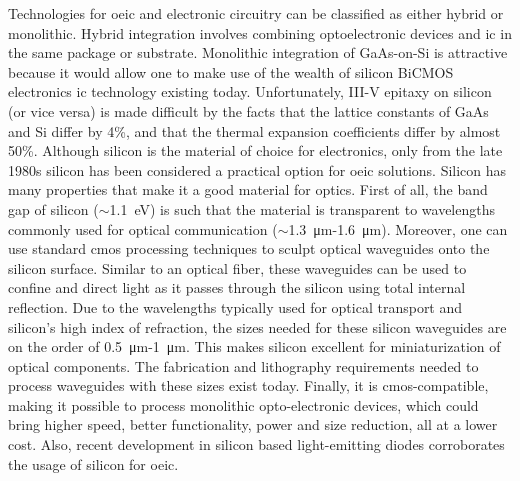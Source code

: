\documentclass[../report.tex]{subfiles}
\begin{document}
Technologies for \gls{oeic} and electronic circuitry can be classified as either hybrid or monolithic. Hybrid integration involves combining optoelectronic devices and \gls{ic} in the same package or substrate. Monolithic integration of GaAs-on-Si is attractive because it would allow one to make use of the wealth of silicon BiCMOS electronics \gls{ic} technology existing today. Unfortunately, III-V epitaxy on silicon (or vice versa) is made difficult by the facts that the lattice constants of GaAs and Si differ by 4\%, and that the thermal expansion coefficients differ by almost 50\%. Although silicon is the material of choice for electronics, only from the late 1980s silicon has been considered a practical option for \gls{oeic} solutions. Silicon has many properties that make it a good material for optics. First of all, the band gap of silicon ($\sim$\SI{1.1}{\electronvolt}) is such that the material is transparent to wavelengths commonly used for optical communication ($\sim$\SI{1.3}{\micro\metre}-\SI{1.6}{\micro\metre}). Moreover, one can use standard \gls{cmos} processing techniques to sculpt optical waveguides onto the silicon surface. Similar to an optical fiber, these waveguides can be used to confine and direct light as it passes through the silicon \cite{reed_silicon_2004} using total internal reflection. Due to the wavelengths typically used for optical transport and silicon’s high index of refraction, the sizes needed for these silicon waveguides are on the order of \SI{0.5}{\micro\metre}-\SI{1}{\micro\metre}. This makes silicon excellent for miniaturization of optical components. The fabrication and lithography requirements needed to process waveguides with these sizes exist today. Finally, it is \gls{cmos}-compatible, making it possible to process monolithic opto-electronic devices, which could bring higher speed, better functionality, power and size reduction, all at a lower cost. Also, recent development in silicon based light-emitting diodes \cite{green_efficient_2001} corroborates the usage of silicon for \gls{oeic}. \par
\end{document}
